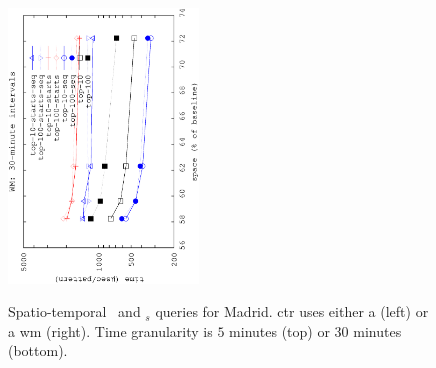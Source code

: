 \begin{figure}[!ht]
\begin{center}
			{\includegraphics[angle=-90,width=0.45\textwidth]{figures_synt/madrid_st_topk_wm_30.eps}}
			
		\end{center}
		\vspace{-0.3cm}
		\caption{Spatio-temporal {\topK\ and \topK$_s$} queries for Madrid. \acrshort{ctr} uses either a \glsacrlong (left) or a \acrlong{wm} (right). 
			Time granularity is $5$ minutes (top) or $30$ minutes (bottom). 
		}
		\label{fig:madridst.tk}

		\vspace{-0.2cm}
		\begin{center}


\end{center}
\end{figure}
